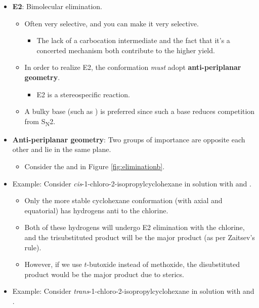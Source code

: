 \documentclass[../notes.tex]{subfiles}
\begin{document}
\begin{itemize}
\begin{itemize}
    \end{itemize}
    \item \textbf{E2}: Bimolecular elimination.
    \begin{itemize}
        \item Often very selective, and you can make it very selective.
        \begin{itemize}
            \item The lack of a carbocation intermediate and the fact that it's a concerted mechanism both contribute to the higher yield.
        \end{itemize}
        \item In order to realize E2, the conformation \emph{must} adopt \textbf{anti-periplanar geometry}.
        \begin{itemize}
            \item E2 is a stereospecific reaction.
        \end{itemize}
        \item A bulky base (such as ) is preferred since such a base reduces competition from S\textsubscript{N}2.
    \end{itemize}
    \item \textbf{Anti-periplanar geometry}: Two groups of importance are opposite each other and lie in the same plane.
    \begin{itemize}
        \item Consider the  and  in Figure \ref{fig:eliminationb}.
    \end{itemize}
    \item Example: Consider \emph{cis}-1-chloro-2-isopropylcyclohexane in solution with  and .
    \begin{itemize}
        \item Only the more stable cyclohexane conformation (with  axial and  equatorial) has hydrogens anti to the chlorine.
        \item Both of these hydrogens will undergo E2 elimination with the chlorine, and the trisubstituted product will be the major product (as per Zaitsev's rule).
        \item However, if we use $t$-butoxide instead of methoxide, the disubstituted product would be the major product due to sterics.
    \end{itemize}
    \item Example: Consider \emph{trans}-1-chloro-2-isopropylcyclohexane in solution with  and .

\end{itemize}
\end{document}
